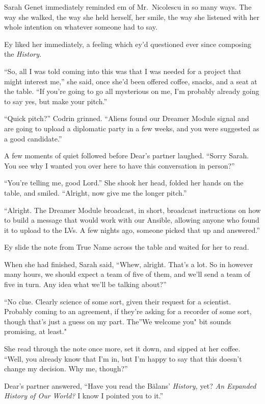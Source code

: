 Sarah Genet immediately reminded em of Mr.~Nicolescu in so many ways. The way she walked, the way she held herself, her smile, the way she listened with her whole intention on whatever someone had to say.

Ey liked her immediately, a feeling which ey'd questioned ever since composing the \emph{History.}

``So, all I was told coming into this was that I was needed for a project that might interest me,'' she said, once she'd been offered coffee, snacks, and a seat at the table. ``If you're going to go all mysterious on me, I'm probably already going to say yes, but make your pitch.''

``Quick pitch?'' Codrin grinned. ``Aliens found our Dreamer Module signal and are going to upload a diplomatic party in a few weeks, and you were suggested as a good candidate.''

A few moments of quiet followed before Dear's partner laughed. ``Sorry Sarah. You see why I wanted you over here to have this conversation in person?''

``You're telling me, good Lord.'' She shook her head, folded her hands on the table, and smiled. ``Alright, now give me the longer pitch.''

``Alright. The Dreamer Module broadcast, in short, broadcast instructions on how to build a message that would work with our Ansible, allowing anyone who found it to upload to the LVs. A few nights ago, someone picked that up and answered.''

Ey slide the note from True Name across the table and waited for her to read.

When she had finished, Sarah said, ``Whew, alright. That's a lot. So in however many hours, we should expect a team of five of them, and we'll send a team of five in turn. Any idea what we'll be talking about?''

``No clue. Clearly science of some sort, given their request for a scientist. Probably coming to an agreement, if they're asking for a recorder of some sort, though that's just a guess on my part. The''We welcome you" bit sounds promising, at least."

She read through the note once more, set it down, and sipped at her coffee. ``Well, you already know that I'm in, but I'm happy to say that this doesn't change my decision. Why me, though?''

Dear's partner answered, ``Have you read the Bălans' \emph{History,} yet? \emph{An Expanded History of Our World?} I know I pointed you to it.''

